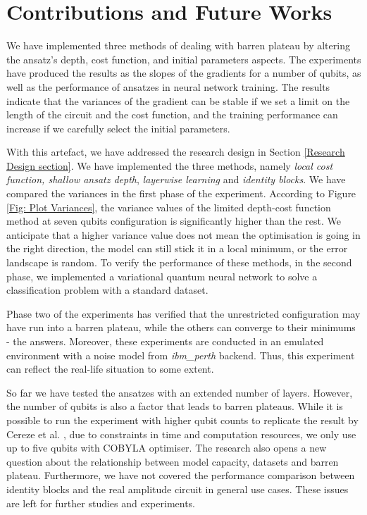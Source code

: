 \section{Contributions and Future Works}

We have implemented three methods of dealing with barren plateau by altering the ansatz's depth, cost function, and initial parameters aspects.
The experiments have produced the results as the slopes of the gradients for a number of qubits, as well as the performance of ansatzes in neural network training.
The results indicate that the variances of the gradient can be stable if we set a limit on the length of the circuit and the cost function, and the training performance can increase if we carefully select the initial parameters.

With this artefact, we have addressed the research design in Section \ref{Research Design section}.
We have implemented the three methods, namely \textit{local cost function, shallow ansatz depth}, \textit{layerwise learning} and \textit{identity blocks}.
We have compared the variances in the first phase of the experiment.
According to Figure \ref{Fig: Plot Variances}, the variance values of the limited depth-cost function method at seven qubits configuration is significantly higher than the rest.
We anticipate that a higher variance value does not mean the optimisation is going in the right direction, the model can still stick it in a local minimum, or the error landscape is random.
To verify the performance of these methods, in the second phase, we implemented a variational quantum neural network to solve a classification problem with a standard dataset.

Phase two of the experiments has verified that the unrestricted configuration may have run into a barren plateau, while the others can converge to their minimums - the answers.
Moreover, these experiments are conducted in an emulated environment with a noise model from \emph{ibm\_perth} backend.
Thus, this experiment can reflect the real-life situation to some extent.


So far we have tested the ansatzes with an extended number of layers.
However, the number of qubits is also a factor that leads to barren plateaus.
While it is possible to run the experiment with higher qubit counts to replicate the result by Cereze et al. \cite{cerezoCostFunctionDependent2021}, due to constraints in time and computation resources, we only use up to five qubits with COBYLA optimiser.
The research also opens a new question about the relationship between model capacity, datasets and barren plateau.
Furthermore, we have not covered the performance comparison between identity blocks and the real amplitude circuit in general use cases.
These issues are left for further studies and experiments.

